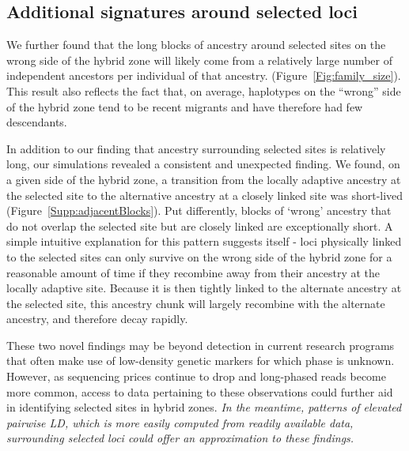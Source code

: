\documentclass[12pt]{article}
\newcommand{\alisa}[1]{{\em \color{red} #1}}
\newcommand{\yb}[1]{{\em \color{magenta} #1}}
\begin{document}
\subsection*{Additional signatures around selected loci} 

We further found that the long blocks of ancestry around selected sites on the wrong side of the hybrid zone will likely come from a relatively large number of independent ancestors per individual of that ancestry. (Figure~\ref{Fig:family_size}). %
This result also reflects the fact that, on average, haplotypes on the ``wrong'' side of the hybrid zone tend to be recent migrants and have therefore had few descendants. 

In addition to our finding that ancestry surrounding selected sites is relatively long, our simulations revealed a consistent and unexpected finding. We found, on a given side of the hybrid zone, a transition from the locally adaptive ancestry at the selected site to the alternative ancestry at a closely linked site was short-lived (Figure~\ref{Supp:adjacentBlocks}). Put differently, blocks of `wrong' ancestry that do not overlap the selected site but are closely linked are exceptionally short. A simple intuitive explanation for this pattern suggests itself - loci physically linked to the selected sites can only survive on the wrong side of the hybrid zone for a reasonable amount of time if they recombine away from their ancestry at the locally adaptive site. Because it is then tightly linked to the alternate ancestry at the selected site, this ancestry chunk will largely recombine with the alternate ancestry, and therefore decay rapidly. 

These two novel findings may be beyond detection in current research programs that often make use of low-density genetic markers for which phase is unknown. However, as sequencing prices continue to drop and long-phased reads become more common, access to data pertaining to these observations could further aid in identifying selected sites in hybrid zones.  %
\alisa{In the meantime, patterns of elevated pairwise LD, which is more easily computed from readily available data, surrounding selected loci could offer an approximation to these findings.}
\end{document}
